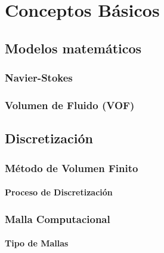 \chapter{Conceptos Básicos} %

\section{Modelos matemáticos}
	\subsection{Navier-Stokes}
	\subsection{Volumen de Fluido (VOF)} %
	
\section{Discretización}
	\subsection{Método de Volumen Finito}
		\subsubsection{Proceso de Discretización}
	\subsection{Malla Computacional}
		\subsubsection{Tipo de Mallas}
